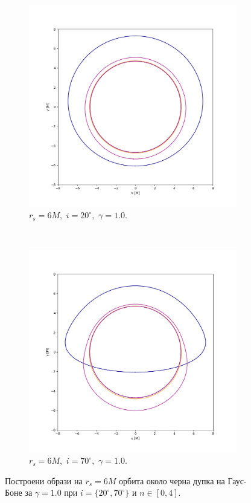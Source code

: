 \begin{figure}[!htb]
	\begin{subfigure}{6cm}
		\includegraphics[scale = 0.3]{GB_20_deg_r6_gamma_1.png}
		\caption{$r_s = 6M,\,\, i = 20^\circ,\,\,\gamma = 1.0$.} 
	\end{subfigure}\,\,\,
	\begin{subfigure}{6cm}
		\includegraphics[scale = 0.3]{GB_70_deg_r6_gamma_1.png}
		\caption{$r_s = 6M,\,\, i = 70^\circ,\,\,\gamma = 1.0$.} 
	\end{subfigure}
	\caption[Построени образи на $r_s = 6M$ орбита около черна дупка на Гаус-Боне за различни инклинации.]{\small Построени образи на $r_s = 6M$ орбита около черна дупка на Гаус-Боне за $\gamma = 1.0$ при $i = \{20^\circ, 70^\circ\}$ и $n\in[0,4]$.} 
	\label{GB_r6_20_deg_gamma_1}
\end{figure}

